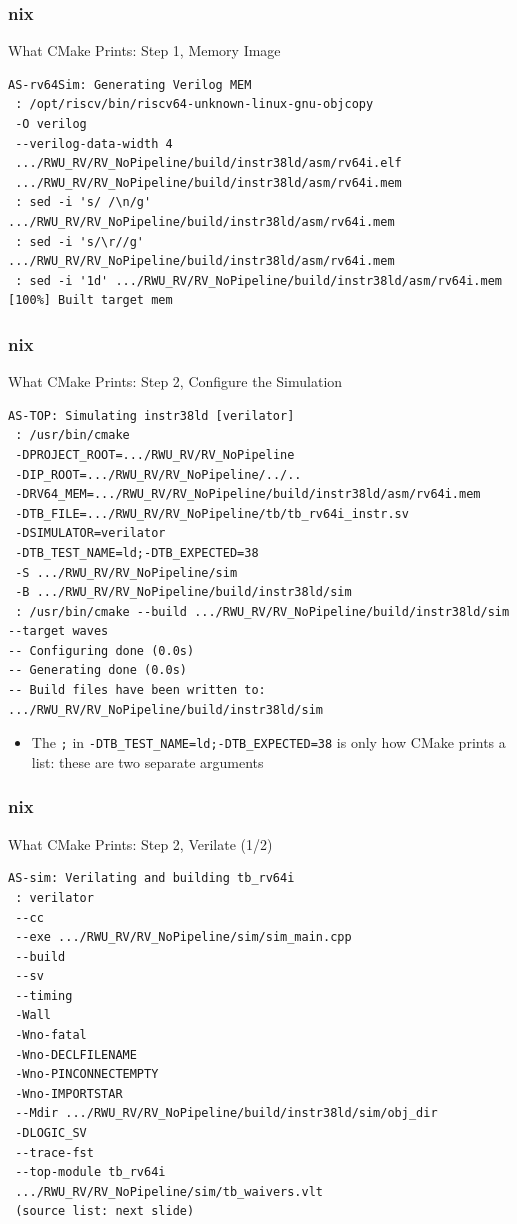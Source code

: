 \documentclass{beamer}
\newcommand{\astitle}{nix}
\newcommand{\assubtitle}{nix}
\newcommand{\cmd}[1]{\texttt{#1}}
\begin{document}
\renewcommand{\assubtitle}{What CMake Prints: Step 1, Memory Image}
\begin{frame}[fragile]
\frametitle{\astitle}
\begin{block}{\assubtitle}
\begin{lstlisting}[style=out]
AS-rv64Sim: Generating Verilog MEM
 : /opt/riscv/bin/riscv64-unknown-linux-gnu-objcopy
 -O verilog
 --verilog-data-width 4
 .../RWU_RV/RV_NoPipeline/build/instr38ld/asm/rv64i.elf
 .../RWU_RV/RV_NoPipeline/build/instr38ld/asm/rv64i.mem
 : sed -i 's/ /\n/g' .../RWU_RV/RV_NoPipeline/build/instr38ld/asm/rv64i.mem
 : sed -i 's/\r//g' .../RWU_RV/RV_NoPipeline/build/instr38ld/asm/rv64i.mem
 : sed -i '1d' .../RWU_RV/RV_NoPipeline/build/instr38ld/asm/rv64i.mem
[100%] Built target mem
\end{lstlisting}
\end{block}
\end{frame}

\renewcommand{\assubtitle}{What CMake Prints: Step 2, Configure the Simulation}
\begin{frame}[fragile]
\frametitle{\astitle}
\begin{block}{\assubtitle}
\begin{lstlisting}[style=out]
AS-TOP: Simulating instr38ld [verilator]
 : /usr/bin/cmake
 -DPROJECT_ROOT=.../RWU_RV/RV_NoPipeline
 -DIP_ROOT=.../RWU_RV/RV_NoPipeline/../..
 -DRV64_MEM=.../RWU_RV/RV_NoPipeline/build/instr38ld/asm/rv64i.mem
 -DTB_FILE=.../RWU_RV/RV_NoPipeline/tb/tb_rv64i_instr.sv
 -DSIMULATOR=verilator
 -DTB_TEST_NAME=ld;-DTB_EXPECTED=38
 -S .../RWU_RV/RV_NoPipeline/sim
 -B .../RWU_RV/RV_NoPipeline/build/instr38ld/sim
 : /usr/bin/cmake --build .../RWU_RV/RV_NoPipeline/build/instr38ld/sim --target waves
-- Configuring done (0.0s)
-- Generating done (0.0s)
-- Build files have been written to: .../RWU_RV/RV_NoPipeline/build/instr38ld/sim
\end{lstlisting}
  \begin{itemize}
    \item The \cmd{;} in \cmd{-DTB\_TEST\_NAME=ld;-DTB\_EXPECTED=38} is only how
      CMake prints a list: these are two separate arguments
  \end{itemize}
\end{block}
\end{frame}

\renewcommand{\assubtitle}{What CMake Prints: Step 2, Verilate (1/2)}
\begin{frame}[fragile]
\frametitle{\astitle}
\begin{block}{\assubtitle}
\begin{lstlisting}[style=out]
AS-sim: Verilating and building tb_rv64i
 : verilator
 --cc
 --exe .../RWU_RV/RV_NoPipeline/sim/sim_main.cpp
 --build
 --sv
 --timing
 -Wall
 -Wno-fatal
 -Wno-DECLFILENAME
 -Wno-PINCONNECTEMPTY
 -Wno-IMPORTSTAR
 --Mdir .../RWU_RV/RV_NoPipeline/build/instr38ld/sim/obj_dir
 -DLOGIC_SV
 --trace-fst
 --top-module tb_rv64i
 .../RWU_RV/RV_NoPipeline/sim/tb_waivers.vlt
 (source list: next slide)
\end{lstlisting}
\end{block}
\end{frame}
\end{document}
